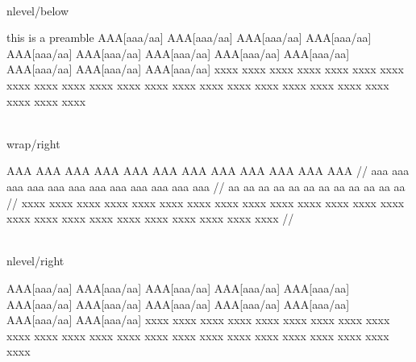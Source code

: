 \documentclass{article}
\begin{document}
\\nlevel/below

\ex[glstyle=nlevel,glftpos=below]
\begingl
\glpreamble this is a preamble\endpreamble
AAA[aaa/aa] AAA[aaa/aa] AAA[aaa/aa] AAA[aaa/aa] AAA[aaa/aa] AAA[aaa/aa]
AAA[aaa/aa] AAA[aaa/aa] AAA[aaa/aa] AAA[aaa/aa] AAA[aaa/aa] AAA[aaa/aa]
\glft
xxxx xxxx xxxx xxxx xxxx xxxx xxxx xxxx
xxxx xxxx xxxx xxxx xxxx xxxx xxxx xxxx
xxxx xxxx xxxx xxxx xxxx xxxx xxxx xxxx
\endgl
\xe

\\wrap/right

\ex[glstyle=wrap,glftpos=right]
\begingl
\gla AAA AAA AAA AAA AAA AAA AAA AAA AAA AAA AAA AAA //
\glb aaa aaa aaa aaa aaa aaa aaa aaa aaa aaa aaa aaa //
\glc aa aa aa aa aa aa aa aa aa aa aa aa //
\glft
xxxx xxxx xxxx xxxx xxxx xxxx xxxx xxxx
xxxx xxxx xxxx xxxx xxxx xxxx xxxx xxxx
xxxx xxxx xxxx xxxx xxxx xxxx xxxx xxxx //
\endgl
\xe

\\nlevel/right

\ex[glstyle=nlevel,glftpos=right]
\begingl
AAA[aaa/aa] AAA[aaa/aa] AAA[aaa/aa] AAA[aaa/aa] AAA[aaa/aa] AAA[aaa/aa]
AAA[aaa/aa] AAA[aaa/aa] AAA[aaa/aa] AAA[aaa/aa] AAA[aaa/aa] AAA[aaa/aa]
\glft
xxxx xxxx xxxx xxxx xxxx xxxx xxxx xxxx
xxxx xxxx xxxx xxxx xxxx xxxx xxxx xxxx
xxxx xxxx xxxx xxxx xxxx xxxx xxxx xxxx
\endgl
\xe
\end{document}
